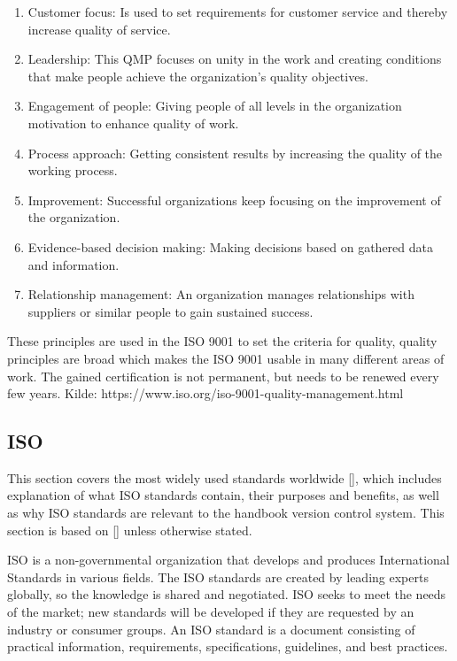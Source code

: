 \begin{enumerate}
        \item Customer focus: Is used to set requirements for customer service and thereby increase quality of service.
        \item Leadership: This QMP focuses on unity in the work and creating conditions that make people achieve the organization's quality objectives.
        \item Engagement of people: Giving people of all levels in the organization motivation to enhance quality of work.
        \item Process approach: Getting consistent results by increasing the quality of the working process.
        \item Improvement: Successful organizations keep focusing on the improvement of the organization.
        \item Evidence-based decision making: Making decisions based on gathered data and information.
        \item Relationship management: An organization manages relationships with suppliers or similar people to gain sustained success.
\end{enumerate}

These principles are used in the ISO 9001 to set the criteria for quality,
quality principles are broad which makes the ISO 9001 usable in many different areas of work.
The gained certification is not permanent, but needs to be renewed every few years.
\newline
Kilde: https://www.iso.org/iso-9001-quality-management.html
\newline

\subsection{ISO}
This section covers the most widely used standards worldwide [], which includes explanation of what ISO standards contain, their purposes and benefits, as well as why ISO standards are relevant to the handbook version control system. This section is based on [] unless otherwise stated.

ISO is a non-governmental organization that develops and produces International Standards in various fields. The ISO standards are created by leading experts globally, so the knowledge is shared and negotiated. ISO seeks to meet the needs of the market; new standards will be developed if they are requested by an industry or consumer groups. An ISO standard is a document consisting of practical information, requirements, specifications, guidelines, and best practices.

